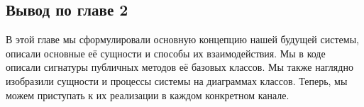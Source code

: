    \subsection*{Вывод по главе 2}
    В этой главе мы сформулировали основную концепцию нашей будущей системы, 
    описали основные её сущности и способы их взаимодействия. Мы в коде описали 
    сигнатуры публичных методов её базовых классов.
    Мы также наглядно изобразили сущности и процессы системы на диаграммах классов.
    Теперь, мы можем приступать к их реализации в каждом конкретном канале.
